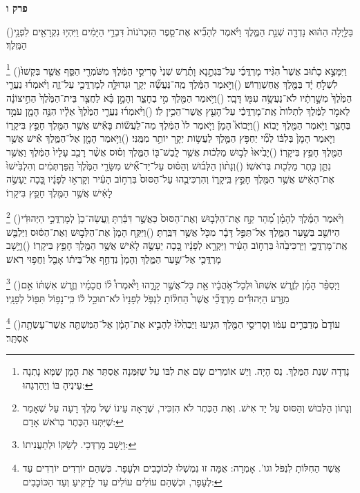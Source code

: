 \documentclass[12pt, openany]{book}
\newcommand{\sethebfont}{
\fontsize{10.5pt}{13.1pt} \selectfont
}
\newcommand{\twocol}[1]{
	{\sethebfont \begin{multicols}{2}
			#1
	\end{multicols}}	
}
\newcommand{\chapname}{}
\newcommand{\newchap}[1]{
	\addcontentsline{toc}{chapter}{#1}
	\renewcommand{\chapname}{#1}
		\begin{center}
			\textbf{%
\fontsize{16pt}{16pt}\selectfont
				#1}
		\end{center}
}
\newcommand{\footnotecomment}[1]{
	\renewcommand\thefootnote{}
	\footnote{#1}}
\newcommand{\commenta}[1]{\footnotecomment{#1}\hspace{0em}}
\newcommand{\vsnum}[1]{(\hebrewnumeral{#1})\space}
\begin{document}
\newchap{פרק ו}
\twocol{\vsnum{1}בַּלַּ֣יְלָה הַה֔וּא נָדְדָ֖ה שְׁנַ֣ת הַמֶּ֑לֶךְ וַיֹּ֗אמֶר לְהָבִ֞יא אֶת־סֵ֤פֶר הַזִּכְרֹנוֹת֙ דִּבְרֵ֣י הַיָּמִ֔ים וַיִּהְי֥וּ נִקְרָאִ֖ים לִפְנֵ֥י הַמֶּֽלֶךְ׃%
\commenta{נָדְדָה שְׁנַת הַמֶּלֶךְ. נֵס הָיָה. וְיֵשׁ אוֹמְרִים שָׂם אֶת לִבּוֹ עַל שֶׁזִּמְּנָה אֶסְתֵּר אֶת הָמָן שֶׁמָּא נָתְנָה עֵינֶיהָ בּוֹ וְיַהַרְגֵהוּ:}%
\vsnum{2}וַיִּמָּצֵ֣א כָת֗וּב אֲשֶׁר֩ הִגִּ֨יד מָרְדֳּכַ֜י עַל־בִּגְתָ֣נָא וָתֶ֗רֶשׁ שְׁנֵי֙ סָרִיסֵ֣י הַמֶּ֔לֶךְ מִשֹּׁמְרֵ֖י הַסַּ֑ף אֲשֶׁ֤ר בִּקְשׁוּ֙ לִשְׁלֹ֣חַ יָ֔ד בַּמֶּ֖לֶךְ אֲחַשְׁוֵרֽוֹשׁ׃
\vsnum{3}וַיֹּ֣אמֶר הַמֶּ֔לֶךְ מַֽה־נַּעֲשָׂ֞ה יְקָ֧ר וּגְדוּלָּ֛ה לְמָרְדֳּכַ֖י עַל־זֶ֑ה וַיֹּ֨אמְר֜וּ נַעֲרֵ֤י הַמֶּ֙לֶךְ֙ מְשָׁ֣רְתָ֔יו לֹא־נַעֲשָׂ֥ה עִמּ֖וֹ דָּבָֽר׃
\vsnum{4}וַיֹּ֥אמֶר הַמֶּ֖לֶךְ מִ֣י בֶחָצֵ֑ר וְהָמָ֣ן בָּ֗א לַחֲצַ֤ר בֵּית־הַמֶּ֙לֶךְ֙ הַחִ֣יצוֹנָ֔ה לֵאמֹ֣ר לַמֶּ֔לֶךְ לִתְלוֹת֙ אֶֽת־מָרְדֳּכַ֔י עַל־הָעֵ֖ץ אֲשֶׁר־הֵכִ֥ין לֽוֹ׃
\vsnum{5}וַיֹּ֨אמְר֜וּ נַעֲרֵ֤י הַמֶּ֙לֶךְ֙ אֵלָ֔יו הִנֵּ֥ה הָמָ֖ן עֹמֵ֣ד בֶּחָצֵ֑ר וַיֹּ֥אמֶר הַמֶּ֖לֶךְ יָבֽוֹא׃
\vsnum{6}וַיָּבוֹא֮ הָמָן֒ וַיֹּ֤אמֶר לוֹ֙ הַמֶּ֔לֶךְ מַה־לַעֲשׂ֕וֹת בָּאִ֕ישׁ אֲשֶׁ֥ר הַמֶּ֖לֶךְ חָפֵ֣ץ בִּיקָר֑וֹ וַיֹּ֤אמֶר הָמָן֙ בְּלִבּ֔וֹ לְמִ֞י יַחְפֹּ֥ץ הַמֶּ֛לֶךְ לַעֲשׂ֥וֹת יְקָ֖ר יוֹתֵ֥ר מִמֶּֽנִּי׃
\vsnum{7}וַיֹּ֥אמֶר הָמָ֖ן אֶל־הַמֶּ֑לֶךְ אִ֕ישׁ אֲשֶׁ֥ר הַמֶּ֖לֶךְ חָפֵ֥ץ בִּיקָרֽוֹ׃
\vsnum{8}יָבִ֙יאוּ֙ לְב֣וּשׁ מַלְכ֔וּת אֲשֶׁ֥ר לָֽבַשׁ־בּ֖וֹ הַמֶּ֑לֶךְ וְס֗וּס אֲשֶׁ֨ר רָכַ֤ב עָלָיו֙ הַמֶּ֔לֶךְ וַאֲשֶׁ֥ר נִתַּ֛ן כֶּ֥תֶר מַלְכ֖וּת בְּרֹאשֽׁוֹ׃
\vsnum{9}וְנָת֨וֹן הַלְּב֜וּשׁ וְהַסּ֗וּס עַל־יַד־אִ֞ישׁ מִשָּׂרֵ֤י הַמֶּ֙לֶךְ֙ הַֽפַּרְתְּמִ֔ים וְהִלְבִּ֙ישׁוּ֙ אֶת־הָאִ֔ישׁ אֲשֶׁ֥ר הַמֶּ֖לֶךְ חָפֵ֣ץ בִּֽיקָר֑וֹ וְהִרְכִּיבֻ֤הוּ עַל־הַסּוּס֙ בִּרְח֣וֹב הָעִ֔יר וְקָרְא֣וּ לְפָנָ֔יו כָּ֚כָה יֵעָשֶׂ֣ה לָאִ֔ישׁ אֲשֶׁ֥ר הַמֶּ֖לֶךְ חָפֵ֥ץ בִּיקָרֽוֹ׃%
\commenta{וְנָתוֹן הַלְּבוּשׁ וְהַסּוּס עַל יַד אִישׁ. וְאֶת הַכֶּתֶר לֹא הִזְכִּיר, שֶׁרָאָה עֵינוֹ שֶׁל מֶלֶךְ רָעָה עַל שֶׁאָמַר שֶׁיִּתְּנוּ הַכֶּתֶר בְּרֹאשׁ אָדָם: }%
\vsnum{10}וַיֹּ֨אמֶר הַמֶּ֜לֶךְ לְהָמָ֗ן מַ֠הֵר קַ֣ח אֶת־הַלְּב֤וּשׁ וְאֶת־הַסּוּס֙ כַּאֲשֶׁ֣ר דִּבַּ֔רְתָּ וַֽעֲשֵׂה־כֵן֙ לְמָרְדֳּכַ֣י הַיְּהוּדִ֔י הַיּוֹשֵׁ֖ב בְּשַׁ֣עַר הַמֶּ֑לֶךְ אַל־תַּפֵּ֣ל דָּבָ֔ר מִכֹּ֖ל אֲשֶׁ֥ר דִּבַּֽרְתָּ׃
\vsnum{11}וַיִּקַּ֤ח הָמָן֙ אֶת־הַלְּב֣וּשׁ וְאֶת־הַסּ֔וּס וַיַּלְבֵּ֖שׁ אֶֽת־מָרְדֳּכָ֑י וַיַּרְכִּיבֵ֙הוּ֙ בִּרְח֣וֹב הָעִ֔יר וַיִּקְרָ֣א לְפָנָ֔יו כָּ֚כָה יֵעָשֶׂ֣ה לָאִ֔ישׁ אֲשֶׁ֥ר הַמֶּ֖לֶךְ חָפֵ֥ץ בִּיקָרֽוֹ׃
\vsnum{12}וַיָּ֥שָׁב מָרְדֳּכַ֖י אֶל־שַׁ֣עַר הַמֶּ֑לֶךְ וְהָמָן֙ נִדְחַ֣ף אֶל־בֵּית֔וֹ אָבֵ֖ל וַחֲפ֥וּי רֹֽאשׁ׃%
\commenta{וַיָּשָׁב מָרְדְּכַי. לְשַׂקּוֹ וּלְתַעֲנִיתוֹ:}%
\vsnum{13}וַיְסַפֵּ֨ר הָמָ֜ן לְזֶ֤רֶשׁ אִשְׁתּוֹ֙ וּלְכָל־אֹ֣הֲבָ֔יו אֵ֖ת כָּל־אֲשֶׁ֣ר קָרָ֑הוּ וַיֹּ֩אמְרוּ֩ ל֨וֹ חֲכָמָ֜יו וְזֶ֣רֶשׁ אִשְׁתּ֗וֹ אִ֣ם מִזֶּ֣רַע הַיְּהוּדִ֡ים מָרְדֳּכַ֞י אֲשֶׁר֩ הַחִלּ֨וֹתָ לִנְפֹּ֤ל לְפָנָיו֙ לֹא־תוּכַ֣ל ל֔וֹ כִּֽי־נָפ֥וֹל תִּפּ֖וֹל לְפָנָֽיו׃%
\commenta{אֲשֶׁר הַחִלּוֹתָ לִנְפֹּל וגו'. אָמְרָה: אֻמָּה זוּ נִמְשְׁלוּ לְכוֹכָבִים וּלְעָפָר. כְּשֶׁהֵם יוֹרְדִים יוֹרְדִים עַד לֶעָפָר, וּכְשֶׁהֵם עוֹלִים עוֹלִים עַד לָרָקִיעַ וְעַד הַכּוֹכָבִים: }%
\vsnum{14}עוֹדָם֙ מְדַבְּרִ֣ים עִמּ֔וֹ וְסָרִיסֵ֥י הַמֶּ֖לֶךְ הִגִּ֑יעוּ וַיַּבְהִ֙לוּ֙ לְהָבִ֣יא אֶת־הָמָ֔ן אֶל־הַמִּשְׁתֶּ֖ה אֲשֶׁר־עָשְׂתָ֥ה אֶסְתֵּֽר׃
\clearpage}
\end{document}
